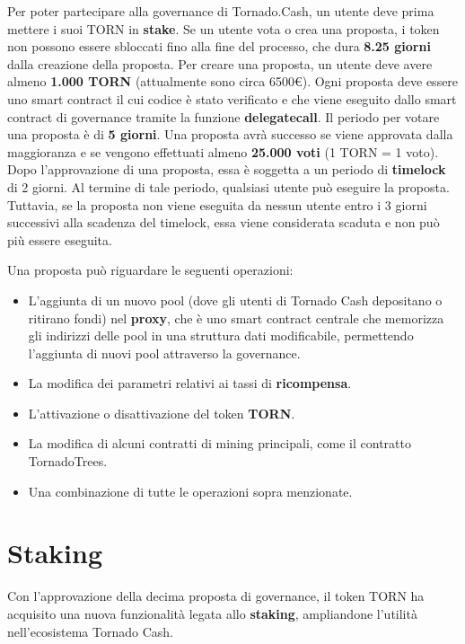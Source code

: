 Per poter partecipare alla governance di Tornado.Cash, un utente deve prima mettere i suoi TORN in \textbf{stake}. Se un utente vota o crea una proposta, i token non possono essere sbloccati fino alla fine del processo, che dura \textbf{8.25 giorni} dalla creazione della proposta.
Per creare una proposta, un utente deve avere almeno \textbf{1.000 TORN} (attualmente sono circa 6500€).
Ogni proposta deve essere uno smart contract il cui codice è stato verificato e che viene eseguito dallo smart contract di governance tramite la funzione \textbf{delegatecall}.
Il periodo per votare una proposta è di \textbf{5 giorni}.  
Una proposta avrà successo se viene approvata dalla maggioranza e se vengono effettuati almeno \textbf{25.000 voti} (1 TORN = 1 voto).
Dopo l'approvazione di una proposta, essa è soggetta a un periodo di \textbf{timelock} di 2 giorni. Al termine di tale periodo, qualsiasi utente può eseguire la proposta. Tuttavia, se la proposta non viene eseguita da nessun utente entro i 3 giorni successivi alla scadenza del timelock, essa viene considerata scaduta e non può più essere eseguita.

Una proposta può riguardare le seguenti operazioni:

\begin{itemize}
    \item L’aggiunta di un nuovo pool (dove gli utenti di Tornado Cash depositano o ritirano fondi) nel \textbf{proxy}, che è uno smart contract centrale che memorizza gli indirizzi delle pool in una struttura dati modificabile, permettendo l'aggiunta di nuovi pool attraverso la governance.
    \item La modifica dei parametri relativi ai tassi di \textbf{ricompensa}.
    \item L'attivazione o disattivazione del token \textbf{TORN}.
    \item La modifica di alcuni contratti di mining principali, come il contratto TornadoTrees.
    \item Una combinazione di tutte le operazioni sopra menzionate.
\end{itemize}

\section{Staking}

Con l'approvazione della decima proposta di governance, il token TORN ha acquisito una nuova funzionalità legata allo \textbf{staking}, ampliandone l'utilità nell'ecosistema Tornado Cash.


